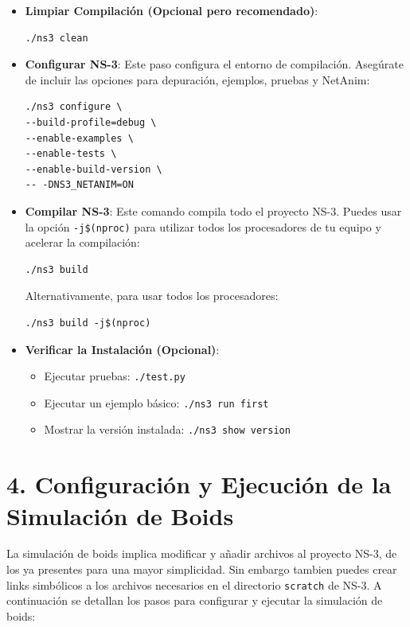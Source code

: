 \documentclass{article}
\begin{document}
\begin{itemize}
    \item \textbf{Limpiar Compilación (Opcional pero recomendado)}:
    \begin{lstlisting}
./ns3 clean 
    \end{lstlisting}
    \item \textbf{Configurar NS-3}: Este paso configura el entorno de compilación. Asegúrate de incluir las opciones para depuración, ejemplos, pruebas y NetAnim:
    \begin{lstlisting}
./ns3 configure \
--build-profile=debug \
--enable-examples \
--enable-tests \
--enable-build-version \
-- -DNS3_NETANIM=ON 
    \end{lstlisting}
    \item \textbf{Compilar NS-3}: Este comando compila todo el proyecto NS-3. Puedes usar la opción \texttt{-j\$(nproc)} para utilizar todos los procesadores de tu equipo y acelerar la compilación:
    \begin{lstlisting}
./ns3 build 
    \end{lstlisting}
    Alternativamente, para usar todos los procesadores:
    \begin{lstlisting}
./ns3 build -j$(nproc) 
    \end{lstlisting}
    \item \textbf{Verificar la Instalación (Opcional)}:
    \begin{itemize}
        \item Ejecutar pruebas: \texttt{./test.py} 
        \item Ejecutar un ejemplo básico: \texttt{./ns3 run first} 
        \item Mostrar la versión instalada: \texttt{./ns3 show version} 
    \end{itemize}
\end{itemize}

\section*{\textbf{4. Configuración y Ejecución de la Simulación de Boids}}

La simulación de boids implica modificar y añadir archivos al proyecto NS-3, de los ya presentes para una mayor simplicidad. Sin embargo tambien puedes crear links simbólicos a los archivos necesarios en el directorio \texttt{scratch} de NS-3. A continuación se detallan los pasos para configurar y ejecutar la simulación de boids:
\end{document}
